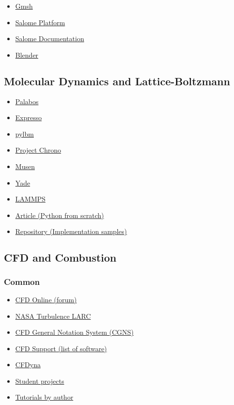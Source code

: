 \begin{itemize}
	\item\href{https://gmsh.info/}
	{Gmsh}
	\item\href{https://www.salome-platform.org/}
	{Salome Platform}
	\item\href{https://docs.salome-platform.org/latest/main/index.html}
	{Salome Documentation}
	\item\href{https://docs.blender.org/manual/en/latest/getting_started/index.html}
	{Blender}
\end{itemize}

\subsection{Molecular Dynamics and Lattice-Boltzmann}

\begin{itemize}
	\item\href{https://palabos.unige.ch/}
	{Palabos}
	\item\href{https://espressomd.org/wordpress/}
	{Expresso}
	\item\href{https://pylbm.readthedocs.io/en/latest/}
	{pylbm}
	\item\href{https://projectchrono.org/}
	{Project Chrono}
	\item\href{https://msolids.net/documentation/}
	{Musen}
	\item\href{https://yade-dem.org/doc/}
	{Yade}
	\item\href{https://docs.lammps.org/Manual.html}
	{LAMMPS}
	\item\href{https://medium.com/swlh/create-your-own-lattice-boltzmann-simulation-with-python-8759e8b53b1c}
	{Article (Python from scratch)}
	\item\href{https://github.com/jviquerat/lbm}
	{Repository (Implementation samples)}
\end{itemize}

\subsection{CFD and Combustion}

\subsubsection{Common}

\begin{itemize}
	\item\href{https://www.cfd-online.com/}
	{CFD Online (forum)}
	\item\href{https://turbmodels.larc.nasa.gov/}
	{NASA Turbulence LARC}
	\item\href{http://cgns.github.io/}
	{CFD General Notation System (CGNS)}
	\item\href{https://www.cfdsupport.com/cae-open-source-software.html}
	{CFD Support (list of software)}
	\item\href{http://cfdyna.com/}
	{CFDyna}
	\item\href{https://hmf.enseeiht.fr/travaux/projnum/book/}
	{Student projects}
	\item\href{https://wiki.openfoam.com/Collection_by_authors}
	{Tutorials by author}
\end{itemize}

